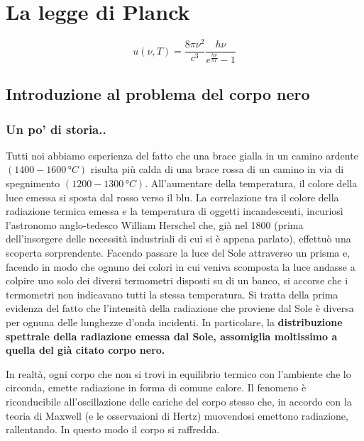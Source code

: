 \documentclass[11pt]{article}
\begin{document}
    \hypertarget{la-legge-di-planck}{%
\section{La legge di Planck}\label{la-legge-di-planck}}

\[
u(\nu,T)= \frac{8\pi \nu^2}{c^3}  \frac{h\nu}{e^{\frac{h\nu}{kT}}-1}
\]

    \hypertarget{introduzione-al-problema-del-corpo-nero}{%
\subsection{Introduzione al problema del corpo nero
}\label{introduzione-al-problema-del-corpo-nero}}

\hypertarget{un-po-di-storia..}{%
\subsubsection{Un po' di storia.. }\label{un-po-di-storia..}}

Tutti noi abbiamo esperienza del fatto che una brace gialla in un camino
ardente \((1400-1600\, °C)\) risulta più calda di una brace rossa di un
camino in via di spegnimento \((1200-1300\, °C)\). All'aumentare della
temperatura, il colore della luce emessa si sposta dal rosso verso il
blu. La correlazione tra il colore della radiazione termica emessa e la
temperatura di oggetti incandescenti, incuriosì l'astronomo
anglo-tedesco William Herschel che, già nel 1800 (prima dell'insorgere
delle necessità industriali di cui si è appena parlato), effettuò una
scoperta sorprendente. Facendo passare la luce del Sole attraverso un
prisma e, facendo in modo che ognuno dei colori in cui veniva scomposta
la luce andasse a colpire uno solo dei diversi termometri disposti su di
un banco, si accorse che i termometri non indicavano tutti la stessa
temperatura. Si tratta della prima evidenza del fatto che l'intensità
della radiazione che proviene dal Sole è diversa per ognuna delle
lunghezze d'onda incidenti. In particolare, la \textbf{distribuzione
spettrale della radiazione emessa dal Sole, assomiglia moltissimo a
quella del già citato corpo nero.}

In realtà, ogni corpo che non si trovi in equilibrio termico con
l'ambiente che lo circonda, emette radiazione in forma di comune calore.
Il fenomeno è riconducibile all'oscillazione delle cariche del corpo
stesso che, in accordo con la teoria di Maxwell (e le osservazioni di
Hertz) muovendosi emettono radiazione, rallentando. In questo modo il
corpo si raffredda.
\end{document}
